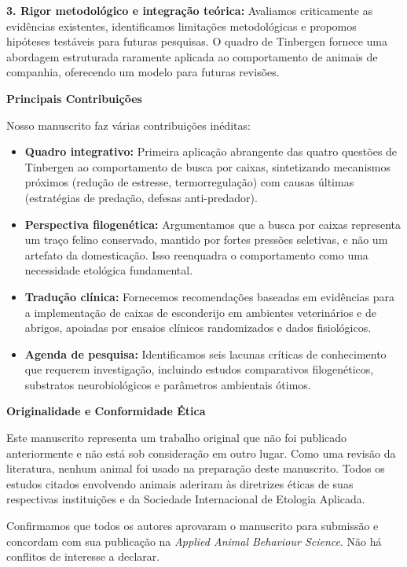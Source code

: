 \documentclass[11pt]{letter}
\begin{document}
\begin{letter}
\textbf{3. Rigor metodológico e integração teórica:} Avaliamos criticamente as evidências existentes, identificamos limitações metodológicas e propomos hipóteses testáveis para futuras pesquisas. O quadro de Tinbergen fornece uma abordagem estruturada raramente aplicada ao comportamento de animais de companhia, oferecendo um modelo para futuras revisões.

\textbf{Principais Contribuições}

Nosso manuscrito faz várias contribuições inéditas:

\begin{itemize}
    \item \textbf{Quadro integrativo:} Primeira aplicação abrangente das quatro questões de Tinbergen ao comportamento de busca por caixas, sintetizando mecanismos próximos (redução de estresse, termorregulação) com causas últimas (estratégias de predação, defesas anti-predador).
    
    \item \textbf{Perspectiva filogenética:} Argumentamos que a busca por caixas representa um traço felino conservado, mantido por fortes pressões seletivas, e não um artefato da domesticação. Isso reenquadra o comportamento como uma necessidade etológica fundamental.
    
    \item \textbf{Tradução clínica:} Fornecemos recomendações baseadas em evidências para a implementação de caixas de esconderijo em ambientes veterinários e de abrigos, apoiadas por ensaios clínicos randomizados e dados fisiológicos.
    
    \item \textbf{Agenda de pesquisa:} Identificamos seis lacunas críticas de conhecimento que requerem investigação, incluindo estudos comparativos filogenéticos, substratos neurobiológicos e parâmetros ambientais ótimos.
\end{itemize}

\textbf{Originalidade e Conformidade Ética}

Este manuscrito representa um trabalho original que não foi publicado anteriormente e não está sob consideração em outro lugar. Como uma revisão da literatura, nenhum animal foi usado na preparação deste manuscrito. Todos os estudos citados envolvendo animais aderiram às diretrizes éticas de suas respectivas instituições e da Sociedade Internacional de Etologia Aplicada.

Confirmamos que todos os autores aprovaram o manuscrito para submissão e concordam com sua publicação na \textit{Applied Animal Behaviour Science}. Não há conflitos de interesse a declarar.


\end{letter}
\end{document}
